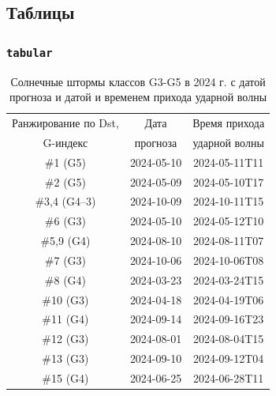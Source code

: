 \documentclass[eqsecnum,authorsinfo]{kioj6}
\begin{document}
    \subsection{Таблицы}

    \subsubsection{\texttt{tabular}}
\begin{table}[ht]
  \centering
\caption{Солнечные штормы классов G3-G5 в 2024 г. с датой прогноза и датой и временем прихода ударной волны}
\label{tbl:events}
\begin{tabular}{|c|c|c|} \hline
  Ранжирование по Dst,   & Дата     & Время прихода            \\
  G-индекс               & прогноза &  ударной волны \\ \hline
  \#1 (G5) & 2024-05-10 & 2024-05-11T11  \\ \hline
  \#2 (G5) & 2024-05-09 & 2024-05-10T17  \\ \hline 
  \#3,4 (G4--3) & 2024-10-09 & 2024-10-11T15  \\ \hline 
  \#6 (G3) & 2024-05-10 & 2024-05-12T10  \\ \hline 
  \#5,9 (G4) & 2024-08-10    & 2024-08-11T07  \\ \hline
  \#7 (G3) & 2024-10-06 & 2024-10-06T08  \\ \hline 
  \#8 (G4) & 2024-03-23 & 2024-03-24T15 \\ \hline
  \#10 (G3) & 2024-04-18 & 2024-04-19T06 \\ \hline
  \#11 (G4) & 2024-09-14 & 2024-09-16T23\\ \hline
  \#12 (G3) & 2024-08-01 & 2024-08-04T15 \\ \hline
  \#13 (G3) & 2024-09-10 & 2024-09-12T04\\ \hline
  \#15 (G4) & 2024-06-25 & 2024-06-28T11\\ \hline 
\end{tabular}
\end{table}
    
\end{document}

